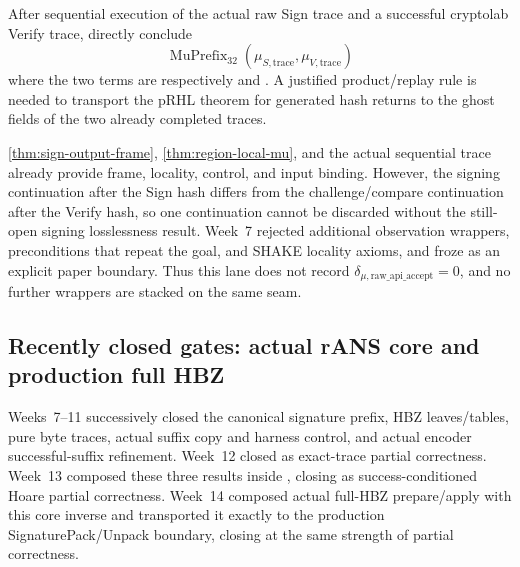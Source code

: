 \begin{obligation}
After sequential execution of the actual raw Sign trace and a successful
cryptolab Verify trace, directly conclude
\[
  \operatorname{MuPrefix}_{32}
  (\mu_{S,\mathrm{trace}},\mu_{V,\mathrm{trace}})
\]
where the two terms are respectively
 and
. A justified product/replay rule
is needed to transport the pRHL theorem for generated hash returns to the ghost
fields of the two already completed traces.
\end{obligation}

\cref{thm:sign-output-frame}, \cref{thm:region-local-mu}, and the actual sequential
trace already provide frame, locality, control, and input binding. However, the
signing continuation after the Sign hash differs from the challenge/compare
continuation after the Verify hash, so one continuation cannot be discarded
without the still-open signing losslessness result. Week~7 rejected additional
observation wrappers, preconditions that repeat the goal, and SHAKE locality
axioms, and froze  as an explicit
\statusdeferred{} paper boundary. Thus this lane does not record
\(\delta_{\mu,\mathrm{raw\_api\_accept}}=0\), and no further wrappers are stacked
on the same seam.

\subsection{Recently closed gates: actual rANS core and production full HBZ}

Weeks~7--11 successively closed the canonical signature prefix, HBZ leaves/tables,
pure byte traces, actual suffix copy and harness control, and actual encoder
successful-suffix refinement. Week~12 closed
 as exact-trace partial correctness. Week~13
composed these three results inside ,
closing  as success-conditioned Hoare partial
correctness. Week~14 composed actual full-HBZ prepare/apply with this core inverse
and transported it exactly to the production SignaturePack/Unpack boundary,
closing  at the same strength of partial correctness.

